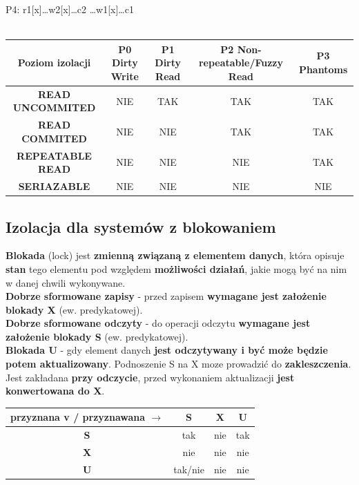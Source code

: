 \documentclass[a4paper]{article}
\begin{document}
    P4: r1[x]\ldots w2[x]…c2 \ldots w1[x]\ldots c1\\\\

    \begin{tabular}{|c||c|c|c|c|}
        \hline
        \textbf{Poziom izolacji} & \textbf{P0} Dirty Write & \textbf{P1} Dirty Read & \textbf{P2} Non-repeatable/Fuzzy
        Read & \textbf{P3} Phantoms \\
        \hline
        \hline
        \textbf{READ UNCOMMITED} & NIE & TAK & TAK & TAK \\
        \hline
        \textbf{READ COMMITED}   & NIE & NIE & TAK & TAK \\
        \hline
        \textbf{REPEATABLE READ} & NIE & NIE & NIE & TAK \\
        \hline
        \textbf{SERIAZABLE}      & NIE & NIE & NIE & NIE \\
        \hline
    \end{tabular}

    \subsection{Izolacja dla systemów z blokowaniem}
    \textbf{Blokada} (lock) jest \textbf{zmienną związaną z elementem danych}, która opisuje \textbf{stan} tego elementu
    pod względem \textbf{możliwości działań}, jakie mogą być na nim w danej chwili wykonywane.\\

    \textbf{Dobrze sformowane zapisy} - przed zapisem \textbf{wymagane jest założenie blokady X} (ew. predykatowej).\\
    \textbf{Dobrze sformowane odczyty} - do operacji odczytu \textbf{wymagane jest założenie blokady S}
    (ew. predykatowej).\\

    \textbf{Blokada U} - gdy element danych \textbf{jest odczytywany i być może będzie potem aktualizowany}.
    Podnoszenie S na X moze prowadzić do \textbf{zakleszczenia}. Jest zakładana \textbf{przy odczycie}, przed wykonaniem
    aktualizacji \textbf{jest konwertowana do X}.\\

    \begin{tabular}{|c||c|c|c|}
        \hline
        \textbf{przyznana} v / \textbf{przyznawana} $\rightarrow$ & \textbf{S} & \textbf{X} & \textbf{U} \\
        \hline
        \hline
        \textbf{S}                                                & tak        & nie        & tak        \\
        \hline
        \textbf{X}                                                & nie        & nie        & nie        \\
        \hline
        \textbf{U}                                                & tak/nie    & nie        & nie        \\
        \hline
    \end{tabular}
\end{document}
